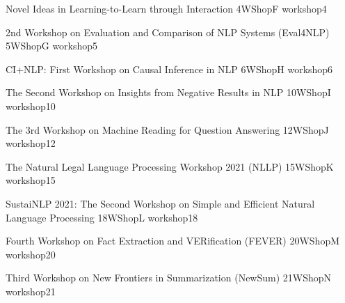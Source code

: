 \begin{wsschedule}
  {Novel Ideas in Learning-to-Learn through Interaction}
  {4}{WShopF}
  {workshop4}
  {\WShopLocC}
  \clearpage
\end{wsschedule}

\begin{wsschedule}
  {2nd Workshop on Evaluation and Comparison of NLP Systems (Eval4NLP)}
  {5}{WShopG}
  {workshop5}
  {\WShopLocF}
  
\end{wsschedule}

\begin{wsschedule}
  {CI+NLP: First Workshop on Causal Inference in NLP}
  {6}{WShopH}
  {workshop6}
  {\WShopLocG}
  
\end{wsschedule}

\begin{wsschedule}
  {The Second Workshop on Insights from Negative Results in NLP}
  {10}{WShopI}
  {workshop10}
  {\WShopLocH}
  
\end{wsschedule}

\begin{wsschedule}
  {The 3rd Workshop on Machine Reading for Question Answering}
  {12}{WShopJ}
  {workshop12}
  {\WShopLocH}
  
\end{wsschedule}

\begin{wsschedule}
  {The Natural Legal Language Processing Workshop 2021 (NLLP) }
  {15}{WShopK}
  {workshop15}
  {\WShopLocH}
  
\end{wsschedule}

\begin{wsschedule}
  {SustaiNLP 2021: The Second Workshop on Simple and Efficient Natural Language Processing}
  {18}{WShopL}
  {workshop18}
  {\WShopLocH}
  
\end{wsschedule}

\begin{wsschedule}
  {Fourth Workshop on Fact Extraction and VERification (FEVER)}
  {20}{WShopM}
  {workshop20}
  {\WShopLocH}
  
\end{wsschedule}

\begin{wsschedule}
  {Third Workshop on New Frontiers in Summarization (NewSum)}
  {21}{WShopN}
  {workshop21}
  {\WShopLocH}
  
\end{wsschedule}


